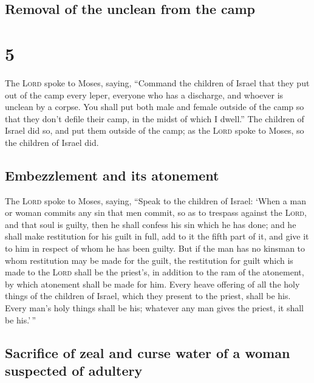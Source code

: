 \hypertarget{removal-of-the-unclean-from-the-camp}{%
\subsection{Removal of the unclean from the
camp}\label{removal-of-the-unclean-from-the-camp}}

\hypertarget{section-4}{%
\section{5}\label{section-4}}

 The \textsc{Lord} spoke to Moses, saying, 
``Command the children of Israel that they put out of the camp every
leper, everyone who has a discharge, and whoever is unclean by a corpse.
 You shall put both male and female outside of the camp so
that they don't defile their camp, in the midst of which I dwell.''
 The children of Israel did so, and put them outside of
the camp; as the \textsc{Lord} spoke to Moses, so the children of Israel
did.

\hypertarget{embezzlement-and-its-atonement}{%
\subsection{Embezzlement and its
atonement}\label{embezzlement-and-its-atonement}}

 The \textsc{Lord} spoke to Moses, saying, 
``Speak to the children of Israel: `When a man or woman commits any sin
that men commit, so as to trespass against the \textsc{Lord}, and that
soul is guilty,  then he shall confess his sin which he
has done; and he shall make restitution for his guilt in full, add to it
the fifth part of it, and give it to him in respect of whom he has been
guilty.  But if the man has no kinsman to whom restitution
may be made for the guilt, the restitution for guilt which is made to
the \textsc{Lord} shall be the priest's, in addition to the ram of the
atonement, by which atonement shall be made for him. 
Every heave offering of all the holy things of the children of Israel,
which they present to the priest, shall be his.  Every
man's holy things shall be his; whatever any man gives the priest, it
shall be his.'\,''

\hypertarget{sacrifice-of-zeal-and-curse-water-of-a-woman-suspected-of-adultery}{%
\subsection{Sacrifice of zeal and curse water of a woman suspected of
adultery}\label{sacrifice-of-zeal-and-curse-water-of-a-woman-suspected-of-adultery}}

